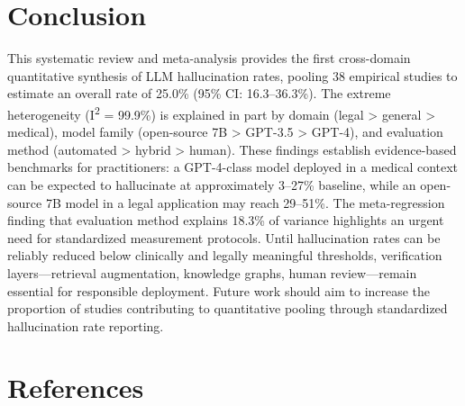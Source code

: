 \documentclass[
  11pt,
  a4paper,
]{article}
\begin{document}
\section{Conclusion}\label{sec-conclusion}

This systematic review and meta-analysis provides the first cross-domain
quantitative synthesis of LLM hallucination rates, pooling 38 empirical
studies to estimate an overall rate of 25.0\% (95\% CI: 16.3--36.3\%).
The extreme heterogeneity (I\textsuperscript{2} = 99.9\%) is explained
in part by domain (legal \textgreater{} general \textgreater{} medical),
model family (open-source 7B \textgreater{} GPT-3.5 \textgreater{}
GPT-4), and evaluation method (automated \textgreater{} hybrid
\textgreater{} human). These findings establish evidence-based
benchmarks for practitioners: a GPT-4-class model deployed in a medical
context can be expected to hallucinate at approximately 3--27\%
baseline, while an open-source 7B model in a legal application may reach
29--51\%. The meta-regression finding that evaluation method explains
18.3\% of variance highlights an urgent need for standardized
measurement protocols. Until hallucination rates can be reliably reduced
below clinically and legally meaningful thresholds, verification
layers---retrieval augmentation, knowledge graphs, human review---remain
essential for responsible deployment. Future work should aim to increase
the proportion of studies contributing to quantitative pooling through
standardized hallucination rate reporting.

\section*{References}\label{references}
\end{document}
